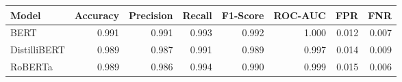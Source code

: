 \begin{tabular}{|l||r|r|r|r|r|r|r|}
\toprule
Model & \textbf{Accuracy} & \textbf{Precision} & Recall & \textbf{F1-Score} & \textbf{ROC-AUC} & \textbf{FPR} & FNR \\
\midrule \midrule
BERT & 0.991 & 0.991 & 0.993 & 0.992 & 1.000 & 0.012 & 0.007 \\
DistilliBERT & 0.989 & 0.987 & 0.991 & 0.989 & 0.997 & 0.014 & 0.009 \\
RoBERTa & 0.989 & 0.986 & 0.994 & 0.990 & 0.999 & 0.015 & 0.006 \\
\bottomrule
\end{tabular}
